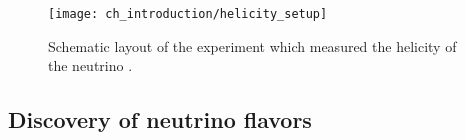 \begin{figure}
    \centering
    \texttt{[image: ch\_introduction/helicity\_setup]}
    \caption{
        Schematic layout of the experiment which measured
        the helicity of the neutrino \cite{helicity_measurement}.
    }
    \label{fig:lampshade}
\end{figure}




\subsection{Discovery of neutrino flavors}
\label{subsec:nu_flavors}

